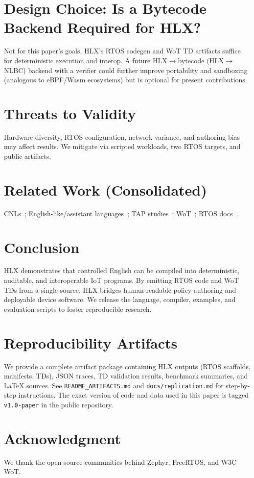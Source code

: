\documentclass[journal]{IEEEtran}
\begin{document}
\section{Design Choice: Is a Bytecode Backend Required for HLX?}
Not for this paper’s goals. HLX’s RTOS codegen and WoT TD artifacts suffice for deterministic execution and interop. A future HLX$\rightarrow$bytecode (HLX$\rightarrow$NLBC) backend with a verifier could further improve portability and sandboxing (analogous to eBPF/Wasm ecosystems) but is optional for present contributions.

\section{Threats to Validity}
Hardware diversity, RTOS configuration, network variance, and authoring bias may affect results. We mitigate via scripted workloads, two RTOS targets, and public artifacts.

\section{Related Work (Consolidated)}
CNLs~\cite{KuhnCNL14,ACEManual}; English-like/assistant languages~\cite{InformSite,AppleScriptGuide,ThingTalk22,GeniePLDI19}; TAP studies~\cite{UrIFTTT16,BrackenburyTAP19}; WoT~\cite{WoT11}; RTOS docs~\cite{ZephyrDocs,FreeRTOSDocs}.

\section{Conclusion}
HLX demonstrates that controlled English can be compiled into deterministic, auditable, and interoperable IoT programs. By emitting RTOS code and WoT TDs from a single source, HLX bridges human-readable policy authoring and deployable device software. We release the language, compiler, examples, and evaluation scripts to foster reproducible research.

\section*{Reproducibility Artifacts}
We provide a complete artifact package containing HLX outputs (RTOS scaffolds, manifests, TDs), JSON traces, TD validation results, benchmark summaries, and LaTeX sources. See \texttt{README\_ARTIFACTS.md} and \texttt{docs/replication.md} for step-by-step instructions. The exact version of code and data used in this paper is tagged \texttt{v1.0-paper} in the public repository.

\section*{Acknowledgment}
We thank the open-source communities behind Zephyr, FreeRTOS, and W3C WoT.



\end{document}
